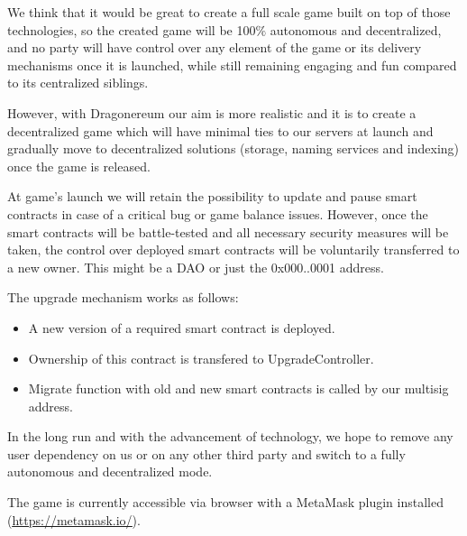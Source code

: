 \documentclass[12pt]{article}
\begin{document}
We think that it would be great to create a full scale game built on top of those technologies, so the created game will be 100$\%$  autonomous and decentralized, and no party will have control over any element of the game or its delivery mechanisms once it is launched, while still remaining engaging and fun compared to its centralized siblings.\par

However, with Dragonereum our aim is more realistic and it is to create a decentralized game which will have minimal ties to our servers at launch and gradually move to decentralized solutions (storage, naming services and indexing) once the game is released.\par

At game's launch we will retain the possibility to update and pause smart contracts in case of a critical bug or game balance issues. However, once the smart contracts will be battle-tested and all necessary security measures will be taken, the control over deployed smart contracts will be voluntarily transferred to a new owner. This might be a DAO or just the 0x000..0001 address.\par

\begin{samepage}
The upgrade mechanism works as follows:\par

\begin{itemize}
\item A new version of a required smart contract is deployed.\par

\item Ownership of this contract is transfered to UpgradeController.\par

\item Migrate function with old and new smart contracts is called by our multisig address.
\end{itemize}\par
\end{samepage}

In the long run and with the advancement of technology, we hope to remove any user dependency on us or on any other third party and switch to a fully autonomous and decentralized mode.\par

The game is currently accessible via browser with a MetaMask plugin installed (\href{https://metamask.io/}{\textcolor[HTML]{1155CC}{\uline{https://metamask.io/}}}).\par
\end{document}
